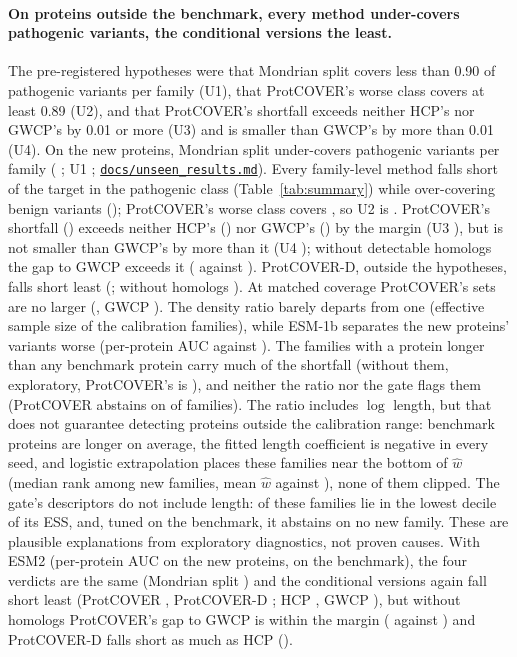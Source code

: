 \paragraph{On proteins outside the benchmark, every method under-covers pathogenic variants, the conditional versions the least.}
The pre-registered hypotheses were that Mondrian split covers less than 0.90 of pathogenic variants per family (U1), that ProtCOVER's worse class covers at least 0.89 (U2), and that ProtCOVER's shortfall exceeds neither HCP's nor GWCP's by 0.01 or more (U3) and is smaller than GWCP's by more than 0.01 (U4). On the new proteins, Mondrian split under-covers pathogenic variants per family (\unsBtwoPath{} \unsBtwoPathCI{}; U1 \unsHone{}; \href{https://github.com/wael-fahmy/protcover/blob/main/docs/unseen_results.md}{\texttt{docs/unseen\_results.md}}). Every family-level method falls short of the target in the pathogenic class (Table~\ref{tab:summary}) while over-covering benign variants (\unsBenignRange{}); ProtCOVER's worse class covers \unsWorstCr{}, so U2 is \unsHtwo{}. ProtCOVER's shortfall (\unsShortCr{}) exceeds neither HCP's (\unsShortHcp{}) nor GWCP's (\unsShortGwcp{}) by the margin (U3 \unsHthree{}), but is not smaller than GWCP's by more than it (U4 \unsHfour{}); without detectable homologs the gap to GWCP exceeds it (\unsStrictShortCr{} against \unsStrictShortGwcp{}). ProtCOVER-D, outside the hypotheses, falls short least (\unsShortCs{}; without homologs \unsStrictShortCs{}). At matched coverage ProtCOVER's sets are no larger (\unsMatchedCr{}, GWCP \unsMatchedGwcp{}). The density ratio barely departs from one (effective sample size \unsEssFrac{} of the calibration families), while ESM-1b separates the new proteins' variants worse (per-protein AUC \unsAuc{} against \unsAucBench{}). The \unsNFamLong{} families with a protein longer than any benchmark protein carry much of the shortfall (without them, exploratory, ProtCOVER's is \unsLenShortCr{}), and neither the ratio nor the gate flags them (ProtCOVER abstains on \unsAbstainCr{} of families). The ratio includes $\log$ length, but that does not guarantee detecting proteins outside the calibration range: benchmark proteins are longer on average, the fitted length coefficient is negative in every seed, and logistic extrapolation places these families near the bottom of $\hat w$ (median rank \unsLongWRank{} among new families, mean $\hat w$ \unsLongWMean{} against \unsRestWMean{}), none of them clipped. The gate's descriptors do not include length: \unsLongLowEss{} of these families lie in the lowest decile of its ESS, and, tuned on the benchmark, it abstains on no new family. These are plausible explanations from exploratory diagnostics, not proven causes. With ESM2 (per-protein AUC \unsTwoAuc{} on the new proteins, \unsTwoAucBench{} on the benchmark), the four verdicts are the same (Mondrian split \unsTwoBtwoPath{}) and the conditional versions again fall short least (ProtCOVER \unsTwoShortCr{}, ProtCOVER-D \unsTwoShortCs{}; HCP \unsTwoShortHcp{}, GWCP \unsTwoShortGwcp{}), but without homologs ProtCOVER's gap to GWCP is within the margin (\unsTwoStrictShortCr{} against \unsTwoStrictShortGwcp{}) and ProtCOVER-D falls short as much as HCP (\unsTwoStrictShortCs{}).


